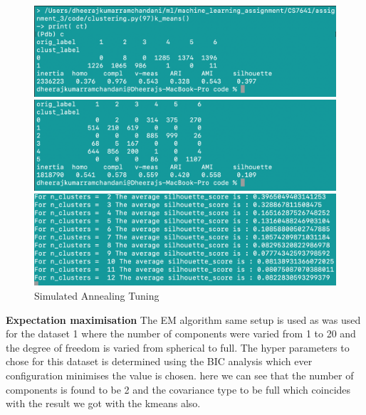 \documentclass[a4paper,12pt]{article}
\begin{document}
\begin{figure}[!htb]
   \begin{minipage}{0.33\textwidth}
     \centering
     \includegraphics[width=.95\linewidth]{kmeans_cluster_21}
   \end{minipage}\hfill
    \begin{minipage}{0.33\textwidth}
     \centering
     \includegraphics[width=.95\linewidth]{kmeans_cluster_22}
     \end{minipage}\hfill
     \begin{minipage}{0.33\textwidth}
     \centering
     \includegraphics[width=.95\linewidth]{kmeans_sil_23}
   \end{minipage}\hfill
 \caption { Simulated Annealing Tuning}
\end{figure}

\textbf{ Expectation maximisation} The EM algorithm same setup is used as was used for the dataset 1 where the number of components were varied from 1 to 20 and the degree of freedom is varied from spherical to full. The hyper parameters to chose for this dataset is determined using the BIC analysis which ever configuration minimises the value is chosen. here we can see that the number of components is found to be 2 and the covariance type to be full which coincides with the result we got with the kmeans also.
\end{document}
